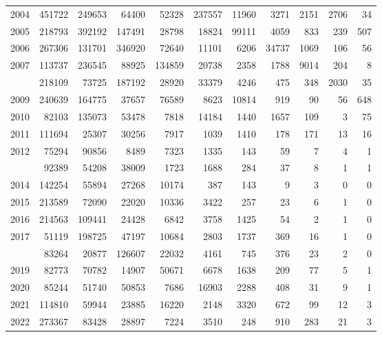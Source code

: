\documentclass[
]{article}
\begin{document}
\begin{longtable}[t]{lrrrrrrrrrr}
2004 & 451722 & 249653 & 64400 & 52328 & 237557 & 11960 & 3271 & 2151 & 2706 & 34\\
2005 & 218793 & 392192 & 147491 & 28798 & 18824 & 99111 & 4059 & 833 & 239 & 507\\
2006 & 267306 & 131701 & 346920 & 72640 & 11101 & 6206 & 34737 & 1069 & 106 & 56\\
2007 & 113737 & 236545 & 88925 & 134859 & 20738 & 2358 & 1788 & 9014 & 204 & 8\\
\addlinespace
2008 & 218109 & 73725 & 187192 & 28920 & 33379 & 4246 & 475 & 348 & 2030 & 35\\
2009 & 240639 & 164775 & 37657 & 76589 & 8623 & 10814 & 919 & 90 & 56 & 648\\
2010 & 82103 & 135073 & 53478 & 7818 & 14184 & 1440 & 1657 & 109 & 3 & 75\\
2011 & 111694 & 25307 & 30256 & 7917 & 1039 & 1410 & 178 & 171 & 13 & 16\\
2012 & 75294 & 90856 & 8489 & 7323 & 1335 & 143 & 59 & 7 & 4 & 1\\
\addlinespace
2013 & 92389 & 54208 & 38009 & 1723 & 1688 & 284 & 37 & 8 & 1 & 1\\
2014 & 142254 & 55894 & 27268 & 10174 & 387 & 143 & 9 & 3 & 0 & 0\\
2015 & 213589 & 72090 & 22020 & 10336 & 3422 & 257 & 23 & 6 & 1 & 0\\
2016 & 214563 & 109441 & 24428 & 6842 & 3758 & 1425 & 54 & 2 & 1 & 0\\
2017 & 51119 & 198725 & 47197 & 10684 & 2803 & 1737 & 369 & 16 & 1 & 0\\
\addlinespace
2018 & 83264 & 20877 & 126607 & 22032 & 4161 & 745 & 376 & 23 & 2 & 0\\
2019 & 82773 & 70782 & 14907 & 50671 & 6678 & 1638 & 209 & 77 & 5 & 1\\
2020 & 85244 & 51740 & 50853 & 7686 & 16903 & 2288 & 408 & 31 & 9 & 1\\
2021 & 114810 & 59944 & 23885 & 16220 & 2148 & 3320 & 672 & 99 & 12 & 3\\
2022 & 273367 & 83428 & 28897 & 7224 & 3510 & 248 & 910 & 283 & 21 & 3\\*
\end{longtable}
\end{document}
